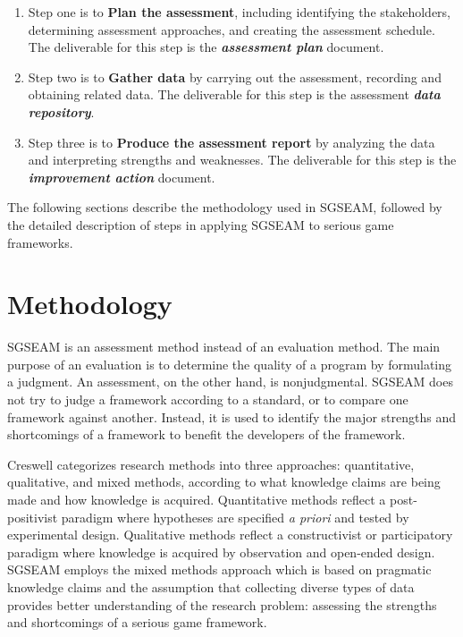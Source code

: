 \begin{enumerate}
\item Step one is to {\bf Plan the assessment}, including
 identifying the stakeholders, determining assessment approaches, and creating the assessment schedule. 
 The deliverable for this step is the \textbf{\textit{assessment
     plan}} document. 

\item Step two is to {\bf Gather data} by carrying out 
 the assessment, recording and obtaining related data. The deliverable for this step is the 
 assessment \textbf{\textit{data repository}}. 

\item Step three is to {\bf Produce the assessment report} by analyzing 
 the data and interpreting strengths and weaknesses. The deliverable
 for this step is the \textbf{\textit{improvement action}} document.

\end{enumerate}
 
The following sections describe the methodology used in SGSEAM, followed by the detailed
description of steps in applying SGSEAM to serious game frameworks.

\section{Methodology}

SGSEAM is an assessment method instead of an evaluation method. The main purpose 
of an evaluation is to determine the quality of a program by formulating a judgment. An assessment, on 
the other hand, is nonjudgmental. SGSEAM does not try to judge a framework according to a 
standard, or to compare one framework against another. Instead, it is used to identify the major 
strengths and shortcomings of a framework to benefit  the developers of the framework.

Creswell \cite{creswell2003} categorizes research methods into three approaches:
quantitative, qualitative, and mixed methods, according to what knowledge claims are being made
and how knowledge is acquired. Quantitative methods reflect a post-positivist paradigm where
hypotheses are specified {\em a priori} and tested by experimental design. Qualitative methods
reflect a constructivist or participatory paradigm where knowledge is acquired by
observation and open-ended design. SGSEAM employs the mixed methods approach which is based on
pragmatic knowledge claims and the assumption that collecting diverse types of data provides better
understanding of the research problem: assessing the strengths and shortcomings of a serious game
framework.

